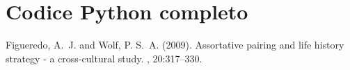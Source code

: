 \documentclass[12pt]{article} %
\begin{document}
	\lipsum[12-13]
	
\newpage
\section{Codice Python completo}
	
	\newpage
	
	\newpage
	


\begin{thebibliography}{99} %

Figueredo, A.~J. and Wolf, P. S.~A. (2009).
\newblock Assortative pairing and life history strategy - a cross-cultural
  study.
, 20:317--330.
 
\end{thebibliography}

\end{document}
